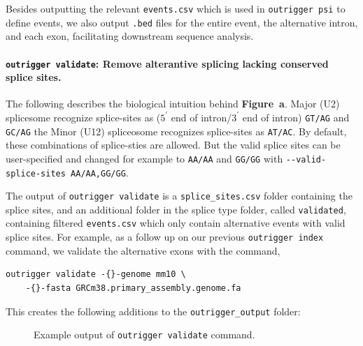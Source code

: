 Besides outputting the relevant \texttt{events.csv} which is used in \texttt{outrigger psi} to define events, we also output \texttt{.bed} files for the entire event, the alternative intron, and each exon, facilitating downstream sequence analysis.


\paragraph{\texttt{outrigger validate}: Remove alterantive splicing lacking conserved splice sites.} The following describes the biological intuition behind \textbf{Figure~a}. Major (U2) splicesome recognize splice-sites as  ($5^\prime$ end of intron/$3^\prime$ end of intron) \texttt{GT/AG} and \texttt{GC/AG} the Minor (U12) spliceosome recognizes splice-sites as \texttt{AT/AC}\cite{McManus:2011en,GarciaBlanco:2004kl}. By default, these combinations of splice-sties are allowed. But the valid splice sites can be user-specified and changed for example to \texttt{AA/AA} and \texttt{GG/GG} with \texttt{-{}-valid-splice-sites~AA/AA,GG/GG}.

The output of \texttt{outrigger validate} is a \texttt{splice\_sites.csv} folder containing the splice sites, and an additional folder in the splice type folder, called \texttt{validated}, containing filtered \texttt{events.csv} which only contain alternative events with valid splice sites. For example, as a follow up on our previous \texttt{outrigger index} command, we validate the alternative exons with the command,

\begin{verbatim}
outrigger validate -{}-genome mm10 \
    -{}-fasta GRCm38.primary_assembly.genome.fa
\end{verbatim}

This creates the following additions to the \texttt{outrigger\_output} folder:

\begin{figure}
\footnotesize
{}
\caption{Example output of \texttt{outrigger validate} command.}
\end{figure}


